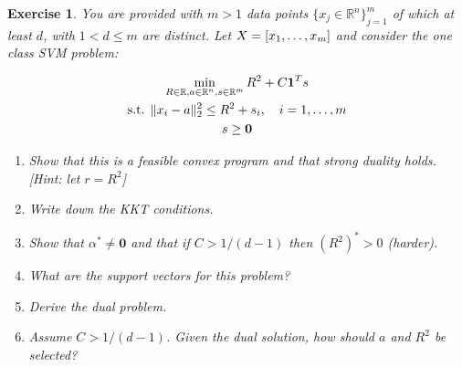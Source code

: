 \documentclass[12pt]{article}
\theoremstyle{colon}
\newtheorem{exercise}{Exercise}
\begin{document}
\begin{exercise}
  You are provided with $m > 1$ data points $\{x_j \in \mathbb{R}^n\}_{j=1}^m$ of which at least $d$, with $1 < d \leq m$ are distinct. Let $X = [x_1,  \mathellipsis, x_m]$ and consider the one class SVM problem:

  \begin{gather*}
    \min_{R \in \mathbb{R}, a \in \mathbb{R}^n, s \in \mathbb{R}^m} R^2 + C \bm{1}^T s \\
    \text{s.t. } \lVert x_i - a \rVert_2^2 \leq R^2 + s_i, \quad i = 1, \mathellipsis, m \\
    s \geq \bm{0}
  \end{gather*}

  \begin{enumerate}[label=\alph*)]
    \item Show that this is a feasible convex program and that strong duality holds. [Hint: let $r = R^2$]

    \item Write down the KKT conditions.

    \item Show that $\alpha^* \neq \bm{0}$ and that if $C > 1/(d-1)$ then $(R^2)^* > 0$ (harder).

    \item What are the support vectors for this problem?

    \item Derive the dual problem.

    \item Assume $C > 1/(d-1)$. Given the dual solution, how should $a$ and $R^2$ be selected?
  \end{enumerate}
\end{exercise}
\end{document}

